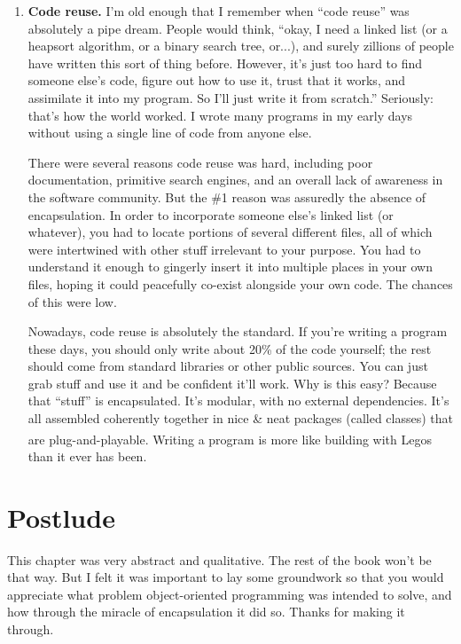 \begin{enumerate}
\item \textbf{Code reuse.} I'm old enough that I remember when ``code reuse''
was absolutely a pipe dream. People would think, ``okay, I need a linked list
(or a heapsort algorithm, or a binary search tree, or...), and surely zillions
of people have written this sort of thing before. However, it's just too hard
to find someone else's code, figure out how to use it, trust that it works,
and assimilate it into my program. So I'll just write it from scratch.''
Seriously: that's how the world worked. I wrote many programs in my early days
without using a single line of code from anyone else.

There were several reasons code reuse was hard, including poor documentation,
primitive search engines, and an overall lack of awareness in the software
community. But the \#1 reason was assuredly the absence of encapsulation. In
order to incorporate someone else's linked list (or whatever), you had to
locate portions of several different files, all of which were intertwined with
other stuff irrelevant to your purpose. You had to understand it enough to
gingerly insert it into multiple places in your own files, hoping it could
peacefully co-exist alongside your own code. The chances of this were low.

Nowadays, code reuse is absolutely the standard. If you're writing a program
these days, you should only write about 20\% of the code yourself; the rest
should come from standard libraries or other public sources. You can just grab
stuff and use it and be confident it'll work. Why is this easy? Because that
``stuff'' is encapsulated. It's modular, with no external dependencies. It's
all assembled coherently together in nice \& neat packages (called classes)
that are plug-and-playable. Writing a program is more like building with
Legos\textsuperscript{\textregistered} than it ever has been.


\end{enumerate}

\section*{Postlude}

This chapter was very abstract and qualitative. The rest of the book won't be
that way. But I felt it was important to lay some groundwork so that you would
appreciate what problem object-oriented programming was intended to solve, and
how through the miracle of encapsulation it did so. Thanks for making it
through.



